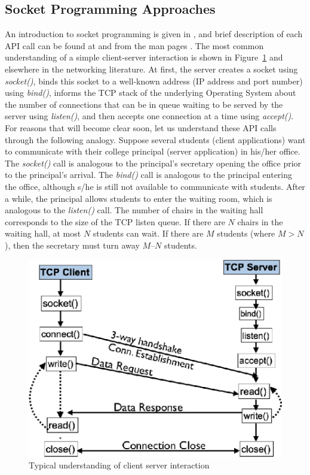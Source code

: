 \begin{multicols}{2}
\section{Socket Programming Approaches}

An introduction to socket programming is given in \cite{art1-key09}\cite{art1-key13}\cite{art1-key15}, and brief description of each API call can be found at \cite{art1-key14} and from the man pages \cite{art1-key16}.  The most common understanding of a simple client-server interaction is shown in Figure~\ref{fig01}\cite{art1-key11} and elsewhere in the networking literature. At first, the server creates a socket using \textit{socket()}, binds this socket to a well-known address (IP address and port number) using \textit{bind()}, informs the TCP stack of the underlying Operating System about the number of connections that can be in queue waiting to be served by the server using \textit{listen()}, and then accepts one connection at a time using \textit{accept()}. For reasons that will become clear soon, let us understand these API calls through the following analogy. Suppose several students (client applications) want to communicate with their college principal (server application) in his/her office. The \textit{socket()} call is analogous to the principal’s secretary opening the office prior to the principal’s arrival. The \textit{bind()} call is analogous to the principal entering the office, although s/he is still not available to communicate with students. After a while, the principal allows students to enter the waiting room, which is analogous to the \textit{listen()} call. The number of chairs in the waiting hall corresponds to the size of the TCP listen queue. If there are $N$ chairs in the waiting hall, at most $N$ students can wait. If there are $M$ students (where $M > N$), then the secretary must turn away $M – N$ students.

\begin{figure}[H]
\centering
\includegraphics[scale=2.3]{src/Figures/chap1/fig01.jpg}
\caption{Typical understanding of client server interaction}\label{fig01}


\end{figure}
\end{multicols}
